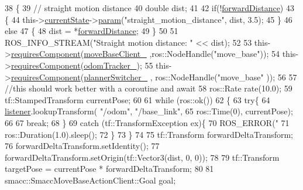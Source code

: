 \begin{DoxyCode}
38   \{
39     \textcolor{comment}{// straight motion distance}
40     \textcolor{keywordtype}{double} dist;
41 
42     \textcolor{keywordflow}{if}(!\hyperlink{classNavigateForward_ad2b2157f0a2c94fd9e1f11ae22d203fc}{forwardDistance})
43     \{
44       this->\hyperlink{classsmacc_1_1SmaccSubStateBehavior_a62e2b9da4a446f09396d0b4c01659b88}{currentState}->\hyperlink{classsmacc_1_1ISmaccState_a4982f2187ed6da337462721146e8ef70}{param}(\textcolor{stringliteral}{"straight\_motion\_distance"}, dist, 3.5);
45     \}
46     \textcolor{keywordflow}{else}
47     \{
48       dist = *\hyperlink{classNavigateForward_ad2b2157f0a2c94fd9e1f11ae22d203fc}{forwardDistance};
49     \}
50         
51     ROS\_INFO\_STREAM(\textcolor{stringliteral}{"Straight motion distance: "} << dist);
52 
53     this->\hyperlink{classsmacc_1_1SmaccSubStateBehavior_a4d25c4ba8ec01c489df172a71bb1c37d}{requiresComponent}(\hyperlink{classNavigateForward_adeec3efc00297e64467a83d5ef82c44c}{moveBaseClient\_} ,ros::NodeHandle(\textcolor{stringliteral}{"move\_base"}));
54     this->\hyperlink{classsmacc_1_1SmaccSubStateBehavior_a4d25c4ba8ec01c489df172a71bb1c37d}{requiresComponent}(\hyperlink{classNavigateForward_a1805443ef8d8fe292af6bde6298e43c9}{odomTracker\_});
55     this->\hyperlink{classsmacc_1_1SmaccSubStateBehavior_a4d25c4ba8ec01c489df172a71bb1c37d}{requiresComponent}(\hyperlink{classNavigateForward_a61052be8826f5bce96f56bfd0a0a8339}{plannerSwitcher\_} , ros::NodeHandle(\textcolor{stringliteral}{"move\_base"}
      ));   
56 
57     \textcolor{comment}{//this should work better with a coroutine and await}
58     ros::Rate rate(10.0);
59     tf::StampedTransform currentPose;
60 
61     \textcolor{keywordflow}{while} (ros::ok())
62     \{
63         \textcolor{keywordflow}{try}\{
64         \hyperlink{classNavigateForward_a40927a8ea2a861c7bb3ece9256600552}{listener}.lookupTransform( \textcolor{stringliteral}{"/odom"},  \textcolor{stringliteral}{"/base\_link"},
65                                 ros::Time(0), currentPose);
66 
67          \textcolor{keywordflow}{break};
68         \}
69         \textcolor{keywordflow}{catch} (tf::TransformException ex)\{
70         ROS\_ERROR(\textcolor{stringliteral}{"%
71         ros::Duration(1.0).sleep();
72         \}
73     \}   
74 
75     tf::Transform forwardDeltaTransform;
76     forwardDeltaTransform.setIdentity();
77     forwardDeltaTransform.setOrigin(tf::Vector3(dist, 0, 0));
78 
79     tf::Transform targetPose =  currentPose * forwardDeltaTransform;
80     
81     smacc::SmaccMoveBaseActionClient::Goal goal;
}
\end{DoxyCode}
